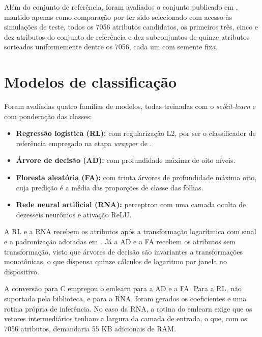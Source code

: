 \documentclass[
	12pt,				%
	openright,			%
	oneside,			%
	a4paper,			%
	english,			%
	brazil,				%
	]{abntex2}
\begin{document}
Além do conjunto de referência, foram avaliados o conjunto publicado em , mantido apenas como comparação por ter sido selecionado com acesso às simulações de teste, todos os 7056 atributos candidatos, os primeiros três, cinco e dez atributos do conjunto de referência e dez subconjuntos de quinze atributos sorteados uniformemente dentre os 7056, cada um com semente fixa.

\section{Modelos de classificação}
Foram avaliadas quatro famílias de modelos, todas treinadas com o \textit{scikit-learn} \cite{[52]} e com ponderação das classes:

\begin{itemize}
    \item \textbf{Regressão logística (RL):} com regularização L2, por ser o classificador de referência empregado na etapa \textit{wrapper} de .

    \item \textbf{Árvore de decisão (AD):} com profundidade máxima de oito níveis.

    \item \textbf{Floresta aleatória (FA):} com trinta árvores de profundidade máxima oito, cuja predição é a média das proporções de classe das folhas.

    \item \textbf{Rede neural artificial (RNA):} perceptron com uma camada oculta de dezesseis neurônios e ativação ReLU.
\end{itemize}

A RL e a RNA recebem os atributos após a transformação logarítmica com sinal e a padronização adotadas em . Já a AD e a FA recebem os atributos sem transformação, visto que árvores de decisão são invariantes a transformações monotônicas, o que dispensa quinze cálculos de logaritmo por janela no dispositivo.

A conversão para C empregou o emlearn \cite{nordby_emlearn} para a AD e a FA. Para a RL, não suportada pela biblioteca, e para a RNA, foram gerados os coeficientes e uma rotina própria de inferência. No caso da RNA, a rotina do emlearn exige que os vetores intermediários tenham a largura da camada de entrada, o que, com os 7056 atributos, demandaria 55 KB adicionais de RAM.
\end{document}
